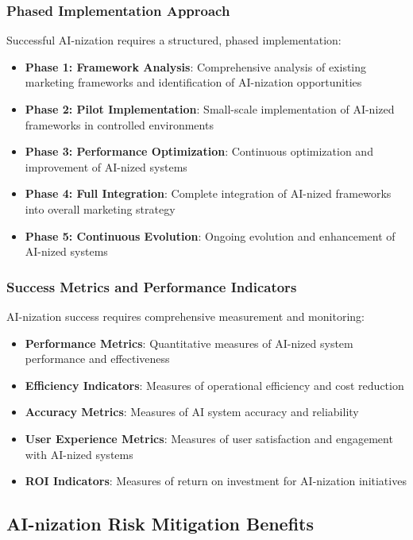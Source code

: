 \subsubsection{Phased Implementation Approach}

Successful AI-nization requires a structured, phased implementation:

\begin{itemize}
    \item \textbf{Phase 1: Framework Analysis}: Comprehensive analysis of existing marketing frameworks and identification of AI-nization opportunities
    \item \textbf{Phase 2: Pilot Implementation}: Small-scale implementation of AI-nized frameworks in controlled environments
    \item \textbf{Phase 3: Performance Optimization}: Continuous optimization and improvement of AI-nized systems
    \item \textbf{Phase 4: Full Integration}: Complete integration of AI-nized frameworks into overall marketing strategy
    \item \textbf{Phase 5: Continuous Evolution}: Ongoing evolution and enhancement of AI-nized systems
\end{itemize}

\subsubsection{Success Metrics and Performance Indicators}

AI-nization success requires comprehensive measurement and monitoring:

\begin{itemize}
    \item \textbf{Performance Metrics}: Quantitative measures of AI-nized system performance and effectiveness
    \item \textbf{Efficiency Indicators}: Measures of operational efficiency and cost reduction
    \item \textbf{Accuracy Metrics}: Measures of AI system accuracy and reliability
    \item \textbf{User Experience Metrics}: Measures of user satisfaction and engagement with AI-nized systems
    \item \textbf{ROI Indicators}: Measures of return on investment for AI-nization initiatives
\end{itemize}

\subsection{AI-nization Risk Mitigation Benefits}

